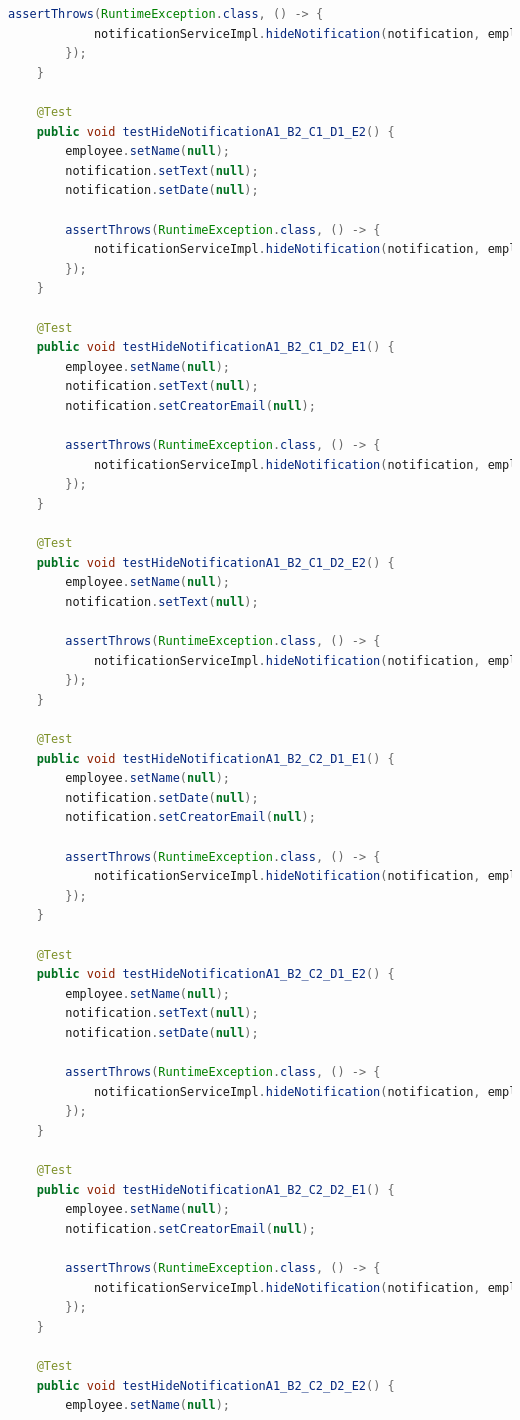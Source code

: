 \begin{lstlisting}[language=java]
        assertThrows(RuntimeException.class, () -> {
            notificationServiceImpl.hideNotification(notification, employee);
        });
    }

    @Test
    public void testHideNotificationA1_B2_C1_D1_E2() {
        employee.setName(null);
        notification.setText(null);
        notification.setDate(null);

        assertThrows(RuntimeException.class, () -> {
            notificationServiceImpl.hideNotification(notification, employee);
        });
    }

    @Test
    public void testHideNotificationA1_B2_C1_D2_E1() {
        employee.setName(null);
        notification.setText(null);
        notification.setCreatorEmail(null);

        assertThrows(RuntimeException.class, () -> {
            notificationServiceImpl.hideNotification(notification, employee);
        });
    }

    @Test
    public void testHideNotificationA1_B2_C1_D2_E2() {
        employee.setName(null);
        notification.setText(null);

        assertThrows(RuntimeException.class, () -> {
            notificationServiceImpl.hideNotification(notification, employee);
        });
    }

    @Test
    public void testHideNotificationA1_B2_C2_D1_E1() {
        employee.setName(null);
        notification.setDate(null);
        notification.setCreatorEmail(null);

        assertThrows(RuntimeException.class, () -> {
            notificationServiceImpl.hideNotification(notification, employee);
        });
    }

    @Test
    public void testHideNotificationA1_B2_C2_D1_E2() {
        employee.setName(null);
        notification.setText(null);
        notification.setDate(null);

        assertThrows(RuntimeException.class, () -> {
            notificationServiceImpl.hideNotification(notification, employee);
        });
    }

    @Test
    public void testHideNotificationA1_B2_C2_D2_E1() {
        employee.setName(null);
        notification.setCreatorEmail(null);

        assertThrows(RuntimeException.class, () -> {
            notificationServiceImpl.hideNotification(notification, employee);
        });
    }

    @Test
    public void testHideNotificationA1_B2_C2_D2_E2() {
        employee.setName(null);


\end{lstlisting}
